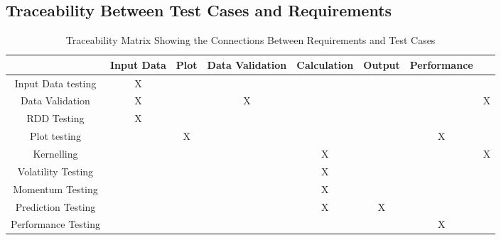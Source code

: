 \documentclass[12pt, titlepage]{article}
\begin{document}

\newpage
\subsection{Traceability Between Test Cases and Requirements}

\begin{table}[h!]
\centering
\begin{tabular}{|c|c|c|c|c|c|c|c|}
\hline
& Input Data & Plot & Data Validation & Calculation & Output &Performance\\
\hline
Input Data testing &X & & & & & \\ \hline
Data Validation &X & &X & & & &X \\ \hline
RDD Testing &X & & & & & & \\ \hline
Plot testing & &X & & & &X \\ \hline
Kernelling & & & & X& & &X \\ \hline
Volatility Testing & & & &X & & & \\ \hline 
Momentum Testing & & & &X & & & \\ \hline 
Prediction Testing & & & &X &X & & \\ \hline 
Performance Testing & & & & & & X& \\ \hline 

\end{tabular}
\caption{Traceability Matrix Showing the Connections Between Requirements and Test Cases}
\label{Table:R_trace}
\end{table}



\end{document}
